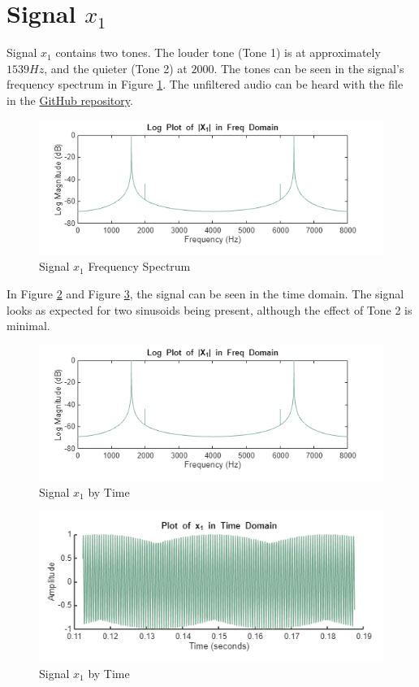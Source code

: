 
\section{Signal $x_1$}

Signal $x_1$ contains two tones.  The louder tone (Tone 1) is at approximately $1539 \unit{Hz}$, and the quieter (Tone 2) at $2000$.  The tones can be seen in the signal's frequency spectrum in Figure \ref{fig:X1}.  The unfiltered audio can be heard with the  file in the \href{https://github.com/dbcometto/ece434_cpx2}{GitHub repository}.

\begin{figure}[H]
    \centering
    \includegraphics[width=0.5\linewidth]{figures/X1.png}
    \caption{Signal $x_1$ Frequency Spectrum}
    \label{fig:X1}
\end{figure}

In Figure \ref{fig:x1} and Figure \ref{fig:x1_zoom}, the signal can be seen in the time domain.  The signal looks as expected for two sinusoids being present, although the effect of Tone 2 is minimal.

\begin{figure}[H]
    \centering
    \includegraphics[width=0.5\linewidth]{figures/x1.png}
    \caption{Signal $x_1$ by Time}
    \label{fig:x1}
\end{figure}

\begin{figure}[H]
    \centering
    \includegraphics[width=0.5\linewidth]{figures/x1_zoom.png}
    \caption{Signal $x_1$ by Time}
    \label{fig:x1_zoom}
\end{figure}

